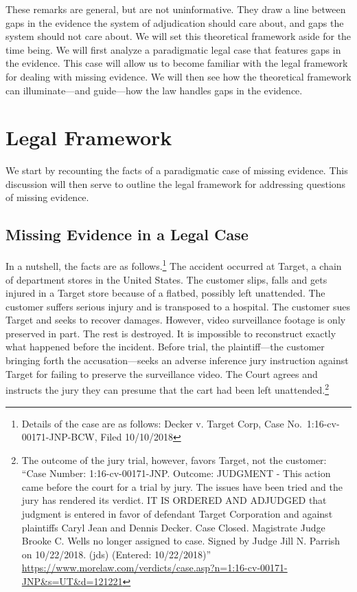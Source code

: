 \documentclass[
  10pt,
  dvipsnames,enabledeprecatedfontcommands]{scrartcl}
\begin{document}
These remarks are general, but are not uninformative. They draw a line
between gaps in the evidence the system of adjudication should care
about, and gaps the system should not care about. We will set this
theoretical framework aside for the time being. We will first analyze a
paradigmatic legal case that features gaps in the evidence. This case
will allow us to become familiar with the legal framework for dealing
with missing evidence. We will then see how the theoretical framework
can illuminate---and guide---how the law handles gaps in the evidence.

\hypertarget{legal-framework}{%
\section{Legal Framework}\label{legal-framework}}

We start by recounting the facts of a paradigmatic case of missing
evidence. This discussion will then serve to outline the legal framework
for addressing questions of missing evidence.

\hypertarget{missing-evidence-in-a-legal-case}{%
\subsection{Missing Evidence in a Legal
Case}\label{missing-evidence-in-a-legal-case}}

In a nutshell, the facts are as follows.\footnote{Details of the case
  are as follows: Decker v. Target Corp, Case No.~1:16-cv-00171-JNP-BCW,
  Filed 10/10/2018} The accident occurred at Target, a chain of
department stores in the United States. The customer slips, falls and
gets injured in a Target store because of a flatbed, possibly left
unattended. The customer suffers serious injury and is transposed to a
hospital. The customer sues Target and seeks to recover damages.
However, video surveillance footage is only preserved in part. The rest
is destroyed. It is impossible to reconstruct exactly what happened
before the incident. Before trial, the plaintiff---the customer bringing
forth the accusation---seeks an adverse inference jury instruction
against Target for failing to preserve the surveillance video. The Court
agrees and instructs the jury they can presume that the cart had been
left unattended.\footnote{The outcome of the jury trial, however, favors
  Target, not the customer: ``Case Number: 1:16-cv-00171-JNP. Outcome:
  JUDGMENT - This action came before the court for a trial by jury. The
  issues have been tried and the jury has rendered its verdict. IT IS
  ORDERED AND ADJUDGED that judgment is entered in favor of defendant
  Target Corporation and against plaintiffs Caryl Jean and Dennis
  Decker. Case Closed. Magistrate Judge Brooke C. Wells no longer
  assigned to case. Signed by Judge Jill N. Parrish on 10/22/2018. (jds)
  (Entered: 10/22/2018)''
  \url{https://www.morelaw.com/verdicts/case.asp?n=1:16-cv-00171-JNP\&s=UT\&d=121221}}
\end{document}
